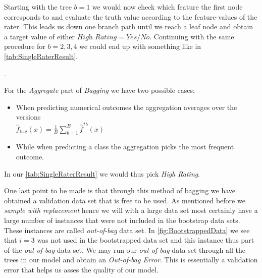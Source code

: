 Starting with the tree $b=1$ we would now check which feature the first node corresponds to and evaluate the truth value according to the feature-values of the rater. This leads us down one branch path until we reach a leaf node and obtain a target value of either $\textit{High Rating} = Yes/No$. Continuing with the same procedure for $b=2,3,4$ we could end up with something like in \cref{tab:SingleRaterResult}.

\setlength\tabcolsep{0pt}
\begin{table}[htb]
    \centering
    \caption{}
    \label{tab:SingleRaterResult}
\end{table}.

For the \textit{Aggregate} part of \textit{Bagging} we have two possible cases;
\begin{itemize}
    \item When predicting numerical outcomes the aggregation averages over the versions \\ $\hat{f}_{\mathrm{bag}}(x)=\frac{1}{B} \sum_{b=1}^{B} \hat{f}^{* b}(x)$
    \item While when predicting a class the aggregation picks the most frequent outcome.
\end{itemize}\cite{Breiman1996}\cite[p.~282]{statelem}
In our \cref{tab:SingleRaterResult} we would thus pick \textit{High Rating}.

One last point to be made is that through this method of bagging we have obtained a validation data set that is free to be used. As mentioned before we \textit{sample with replacement} hence we will with a large data set most certainly have a large number of instances that were not included in the bootstrap data sets. These instances are called \textit{out-of-bag} data set. In \cref{fig:BootstrappedData} we see that $i=3$ was not used in the bootstrapped data set and this instance thus part of the \textit{out-of-bag} data set. We may run our \textit{out-of-bag} data set through all the trees in our model and obtain an \textit{Out-of-bag Error}. This is essentially a validation error that helps us asses the quality of our model.

